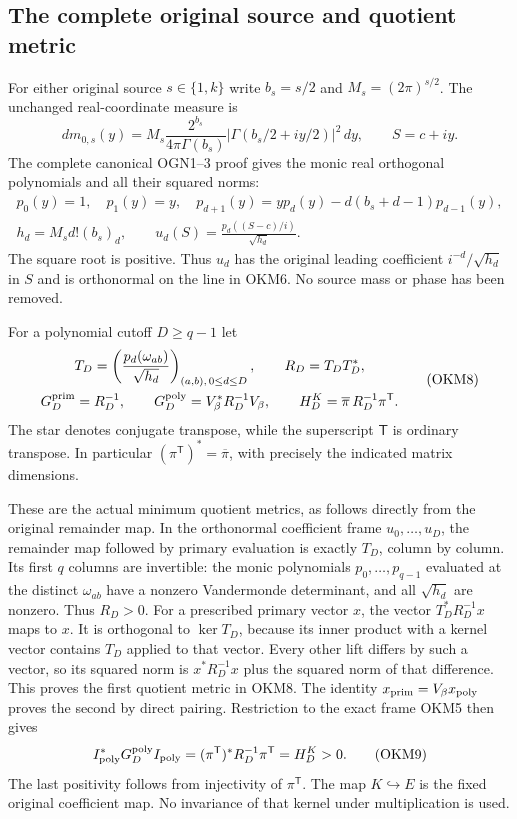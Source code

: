 \documentclass[11pt,a4paper]{article}
\begin{document}
\subsection{The complete original source and quotient metric}
For either original source $s\in\{1,k\}$ write $b_s=s/2$ and
$M_s=(2\pi)^{s/2}$. The unchanged real-coordinate measure is
\[
 dm_{0,s}(y)=M_s\frac{2^{b_s}}{4\pi\Gamma(b_s)}
      |\Gamma(b_s/2+iy/2)|^2\,dy,
 \qquad S=c+iy.
 \tag{OKM6}
\]
The complete canonical OGN1--3 proof gives the monic real
orthogonal polynomials and all their squared norms:
\[
 \begin{gathered}
 p_0(y)=1,\quad p_1(y)=y,\quad
 p_{d+1}(y)=yp_d(y)-d(b_s+d-1)p_{d-1}(y),\\
 h_d=M_s d!(b_s)_d,\qquad
 u_d(S)=\frac{p_d((S-c)/i)}{\sqrt{h_d}}.
 \end{gathered}\tag{OKM7}
\]
The square root is positive. Thus $u_d$ has the original leading
coefficient $i^{-d}/\sqrt{h_d}$ in $S$ and is orthonormal on the
line in OKM6. No source mass or phase has been removed.

For a polynomial cutoff $D\geq q-1$ let
\[
 \begin{gathered}
 T_D=\left(\frac{p_d(\omega_{ab})}{\sqrt{h_d}}\right)_
                        {(a,b),\,0\leq d\leq D},
 \qquad R_D=T_DT_D^*,\\
 G_D^{\rm prim}=R_D^{-1},\qquad
 G_D^{\rm poly}=V_\beta^*R_D^{-1}V_\beta,\qquad
 H_D^K=\overline\pi\,R_D^{-1}\pi^{\mathsf T}.
 \end{gathered}\tag{OKM8}
\]
The star denotes conjugate transpose, while the superscript
$\mathsf T$ is ordinary transpose. In particular
$(\pi^{\mathsf T})^*=\overline\pi$, with precisely the indicated
matrix dimensions.

These are the actual minimum quotient metrics, as follows directly
from the original remainder map. In the orthonormal coefficient
frame $u_0,\ldots,u_D$, the remainder map followed by primary
evaluation is exactly $T_D$, column by column. Its first $q$
columns are invertible: the monic polynomials $p_0,\ldots,p_{q-1}$
evaluated at the distinct $\omega_{ab}$ have a nonzero Vandermonde
determinant, and all $\sqrt{h_d}$ are nonzero. Thus $R_D>0$.
For a prescribed primary vector $x$, the vector
$T_D^*R_D^{-1}x$ maps to $x$. It is orthogonal to $\ker T_D$,
because its inner product with a kernel vector contains $T_D$
applied to that vector. Every other lift differs by such a vector,
so its squared norm is
$x^*R_D^{-1}x$ plus the squared norm of that difference.
This proves the first quotient metric in OKM8.
The identity $x_{\rm prim}=V_\beta x_{\rm poly}$ proves the
second by direct pairing. Restriction to the exact frame OKM5
then gives
\[
 I_{\rm poly}^*G_D^{\rm poly}I_{\rm poly}
 = (\pi^{\mathsf T})^*R_D^{-1}\pi^{\mathsf T}
 =H_D^K>0.
 \tag{OKM9}
\]
The last positivity follows from injectivity of $\pi^{\mathsf T}$.
The map $K\hookrightarrow E$ is the fixed original coefficient
map. No invariance of that kernel under multiplication is used.
\end{document}
